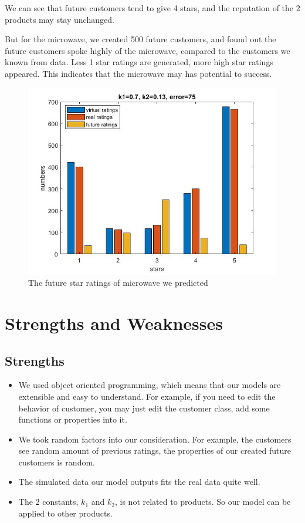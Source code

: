 \documentclass[12pt]{article}  %
\begin{document}
We can see that future customers tend to give 4 stars, and the reputation of the 2 products may stay unchanged.

But for the microwave, we created 500 future customers, and found out the future customers spoke highly of the microwave, compared to the customers we known from data. Less 1 star ratings are generated, more high star ratings appeared. This indicates that the microwave may has potential to success.
\begin{figure}[H]
  \centering
  \includegraphics[width=0.7\linewidth]{Q3picture/microwave.jpg}
  \caption{The future star ratings of microwave we predicted}
  \label{fig:}
\end{figure}



\section{Strengths and Weaknesses}
\subsection{Strengths}
\begin{itemize}
\item We used object oriented programming, which means that our models are extensible and easy to understand. For example, if you need to edit the behavior of customer, you may just edit the customer class, add some functions or properties into it.
  \item We took random factors into our consideration. For example, the customers see random amount of previous ratings, the properties of our created future customers is random.
  \item The simulated data our model outputs fits the real data quite well.
    \item The 2 constants, $k_1$ and $k_{2}$, is not related to products. So our model can be applied to other products.
\end{itemize}
\end{document}
